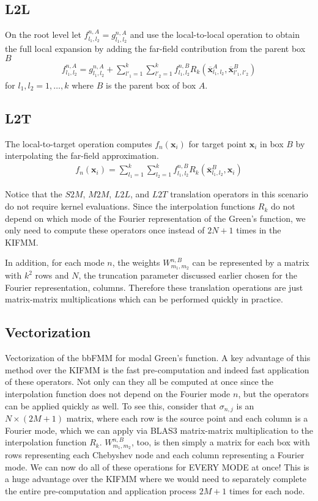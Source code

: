\documentclass[11pt, oneside]{article}   	%
\begin{document}
\subsection{L2L}
On the root level let $f^{n,A}_{l_1,l_2}=g^{n,A}_{l_1,l_2}$ and use the local-to-local operation to obtain the full local expansion by adding the far-field contribution from the parent box $B$
\begin{align}
f^{n,A}_{l_1,l_2}=g^{n,A}_{l_1,l_2} + \sum_{l'_1=1}^k \sum_{l'_2=1}^k f^{n,B}_{l_1,l_2} R_k(\mathbf{\overline{x}}_{l_1,l_2}^A,\mathbf{\overline{x}}_{l'_1,l'_2}^B)
\end{align}
for $l_1,l_2 = 1,\dots,k$ where $B$ is the parent box of box $A$.
\subsection{L2T}
The local-to-target operation computes $f_n(\mathbf{x}_i)$ for target point $\mathbf{x}_i$ in box $B$ by interpolating the far-field approximation.
\begin{align}
f_n(\mathbf{x}_i)=\sum_{l_1=1}^k \sum_{l_2=1}^kf^{n,B}_{l_1,l_2} R_k(\mathbf{\overline{x}}_{l_1,l_2}^B,\mathbf{x}_i)
\end{align}

Notice that the $S2M$, $M2M$, $L2L$, and $L2T$ translation operators in this scenario do not require kernel evaluations. Since the interpolation functions $R_k$ do not depend on which mode of the Fourier representation of the Green's function, we only need to compute these operators once instead of $2N+1$ times in the KIFMM.

In addition, for each mode $n$, the weights $W^{n,B}_{m_1,m_2}$ can be represented by a matrix with $k^2$ rows and $N$, the truncation parameter discussed earlier chosen for the Fourier representation, columns. Therefore these translation operations are just matrix-matrix multiplications which can be performed quickly in practice.

\subsection{Vectorization}
Vectorization of the bbFMM for modal Green's function. A key advantage of this method over the KIFMM is the fast pre-computation and indeed fast application of these operators. Not only can they all be computed at once since the interpolation function does not depend on the Fourier mode $n$, but the operators can be applied quickly as well. To see this, consider that $\sigma_{n,j}$ is an $N\times (2M+1)$ matrix, where each row is the source point and each column is a Fourier mode, which we can apply via BLAS3 matrix-matrix multiplication to the interpolation function $R_k$. $W_{m_1,m_2}^{n,B}$, too, is then simply a matrix for each box with rows representing each Chebyshev node and each column representing a Fourier mode. We can now do all of these operations for EVERY MODE at once! This is a huge advantage over the KIFMM where we would need to separately complete the entire pre-computation and application process $2M+1$ times for each node.
\\
\end{document}
